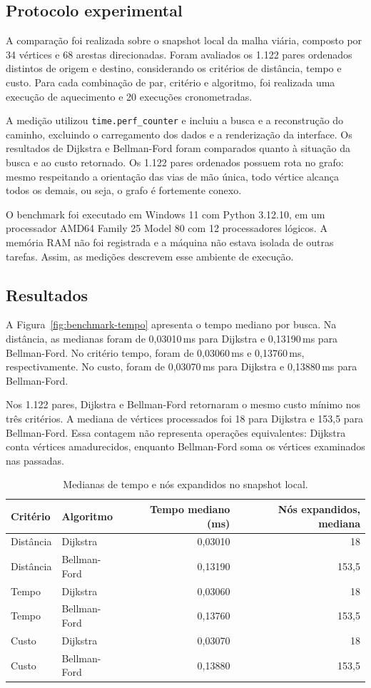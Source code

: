 \documentclass[12pt]{article}
\begin{document}
\subsection{Protocolo experimental}
A comparação foi realizada sobre o snapshot local da malha viária,
composto por 34 vértices e 68 arestas direcionadas. Foram avaliados
os 1.122 pares ordenados distintos de origem e destino, considerando
os critérios de distância, tempo e custo. Para cada combinação de
par, critério e algoritmo, foi realizada uma execução de aquecimento
e 20 execuções cronometradas.

A medição utilizou \texttt{time.perf\_counter} e incluiu a busca e a
reconstrução do caminho, excluindo o carregamento dos dados e a
renderização da interface. Os resultados de Dijkstra e Bellman-Ford
foram comparados quanto à situação da busca e ao custo retornado. Os
1.122 pares ordenados possuem rota no grafo: mesmo respeitando a
orientação das vias de mão única, todo vértice alcança todos os
demais, ou seja, o grafo é fortemente conexo.

O benchmark foi executado em Windows 11 com Python 3.12.10, em um
processador AMD64 Family 25 Model 80 com 12 processadores lógicos.
A memória RAM não foi registrada e a máquina não estava isolada de
outras tarefas. Assim, as medições descrevem esse ambiente de execução.

\subsection{Resultados}
A Figura~\ref{fig:benchmark-tempo} apresenta o tempo mediano por busca.
Na distância, as medianas foram de 0,03010\,ms para Dijkstra e
0,13190\,ms para Bellman-Ford. No critério tempo, foram de 0,03060\,ms
e 0,13760\,ms, respectivamente. No custo, foram de 0,03070\,ms para
Dijkstra e 0,13880\,ms para Bellman-Ford.

Nos 1.122 pares, Dijkstra e Bellman-Ford retornaram o mesmo custo
mínimo nos três critérios. A mediana de vértices processados foi 18
para Dijkstra e 153,5 para Bellman-Ford. Essa
contagem não representa operações
equivalentes: Dijkstra conta vértices amadurecidos, enquanto
Bellman-Ford soma os vértices examinados nas passadas.

\begin{table}[ht]
\centering
\caption{Medianas de tempo e nós expandidos no snapshot local.}
\label{tab:benchmark}
\begin{tabular}{llrr}
\toprule
Critério & Algoritmo & Tempo mediano (ms) & Nós expandidos, mediana \\
\midrule
Distância & Dijkstra      & 0,03010 & 18    \\
Distância & Bellman-Ford  & 0,13190 & 153,5 \\
Tempo     & Dijkstra      & 0,03060 & 18    \\
Tempo     & Bellman-Ford  & 0,13760 & 153,5 \\
Custo     & Dijkstra      & 0,03070 & 18    \\
Custo     & Bellman-Ford  & 0,13880 & 153,5 \\
\bottomrule
\end{tabular}
\end{table}
\end{document}
